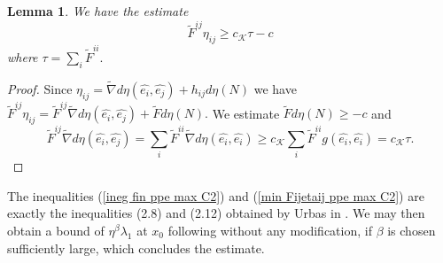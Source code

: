 \documentclass[10pt,reqno,oneside]{amsart}
\newtheorem{lem}{Lemma}[section]
\theoremstyle{definition}
\theoremstyle{remark}
\begin{document}
\begin{lem}
We have the estimate
\begin{equation}\label{min Fijetaij ppe max C2}
\widetilde{F}^{ij}\eta_{ij}\geq c_\mathcal{K}\tau-c
\end{equation}
where $\tau=\sum_{i}\widetilde{F}^{ii}.$
\end{lem}
\begin{proof}
Since $\eta_{ij}=\widetilde{\nabla}d\eta(\widehat{e_i},\widehat{e_j})+h_{ij}d\eta(N)$ we have $\widetilde{F}^{ij}\eta_{ij}=\widetilde{F}^{ij}\widetilde{\nabla}d\eta(\widehat{e_i},\widehat{e_j})+\widetilde{F}d\eta(N).$ We estimate $\widetilde{F}d\eta(N)\geq -c$ and
$$\widetilde{F}^{ij}\widetilde{\nabla}d\eta(\widehat{e_i},\widehat{e_j})=\sum_i\widetilde{F}^{ii}\widetilde{\nabla}d\eta(\widehat{e_i},\widehat{e_i})\geq c_\mathcal{K}\sum_i\widetilde{F}^{ii}g(\widehat{e_i},\widehat{e_i})=c_\mathcal{K}\tau.$$
\end{proof}
The inequalities (\ref{ineg fin ppe max C2}) and (\ref{min Fijetaij ppe max C2}) are exactly the inequalities (2.8) and (2.12) obtained by Urbas in \cite{Ur}. We may then obtain a bound of $\eta^\beta\lambda_1$ at $x_0$ following \cite{Ur} without any modification, if $\beta$ is chosen sufficiently large, which concludes the estimate.
\end{document}

